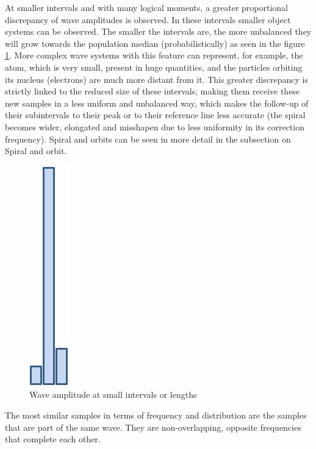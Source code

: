 At smaller intervals and with many logical moments, a greater proportional discrepancy of wave amplitudes is observed. In these intervals smaller object systems can be observed. The smaller the intervals are, the more unbalanced they will grow towards the population median (probabilistically) as seen in the figure \ref{fig:consciousness_space_subconsciousness_min}. More complex wave systems with this feature can represent, for example, the atom, which is very small, present in huge quantities, and the particles orbiting its nucleus (electrons) are much more distant from it. This greater discrepancy is strictly linked to the reduced size of these intervals, making them receive these new samples in a less uniform and unbalanced way, which makes the follow-up of their subintervals to their peak or to their reference line less accurate (the spiral becomes wider, elongated and misshapen due to less uniformity in its correction frequency). Spiral and orbits can be seen in more detail in the subsection on Spiral and orbit.
	\begin{figure}[H]
	\caption{Wave amplitude at small intervals or lengths}
	\label{fig:consciousness_space_subconsciousness_min}
	\centering
	\includegraphics[scale=.45]{sections/images/consciousness_space_subconsciousness_min.jpg}
	\end{figure}

The most similar samples in terms of frequency and distribution are the samples that are part of the same wave. They are non-overlapping, opposite frequencies that complete each other.

